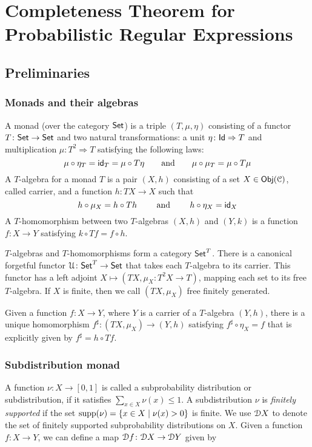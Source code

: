 \chapter{Completeness Theorem for Probabilistic Regular Expressions}
\label{chapter4}

\section{Preliminaries}
\label{c4:sec:preliminaries}
\subsection{Monads and their algebras}\label{c4:subsec:monads}
A monad (over the category ${\mathsf{Set}}$) is a triple $(T, \mu, \eta)$ consisting of a functor $T \colon {\mathsf{Set}} \to {\mathsf{Set}}$ and two natural transformations: a unit $\eta \colon \mathsf{Id} \Rightarrow T$ and multiplication $\mu \colon T^2 \Rightarrow T$ satisfying the following laws:
$$\mu \circ \eta_T = \mathsf{id}_T=  \mu \circ T\eta \qquad \text{and} \qquad \mu \circ \mu_T = \mu \circ T \mu$$
A $T$-algebra for a monad $T$ is a pair $(X, h)$ consisting of a set $X \in \mathsf{Obj}(\mathcal{C})$, called carrier, and a function $h \colon T X \to X$ such that 
$$
h \circ \mu_X = h \circ Th \qquad \text{ and }\qquad h \circ \eta_X = \mathsf{id}_X
$$
A $T$-homomorphism between two $T$-algebras $(X,h)$ and $(Y,k)$ is a function 	$f \colon X \to Y$ satisfying $k \circ Tf = f \circ h$.

$T$-algebras and $T$-homomorphisms form a category ${\mathsf{Set}}^T$. There is a canonical forgetful functor $\mathcal{U} \colon {\mathsf{Set}}^T \to {\mathsf{Set}}$ that takes each $T$-algebra to its carrier. This functor has a left adjoint $X \mapsto (TX, \mu_X \colon T^2 X \to T)$, mapping each set to its free $T$-algebra. If $X$ is finite, then we call $(TX, \mu_X)$ free finitely generated.

Given a function $f \colon X \to Y$, where $Y$ is a carrier of a $T$-algebra $(Y, h)$, there is a unique homomorphism $f^\sharp \colon (TX, \mu_X) \to (Y,h)$ satisfying $f^\sharp \circ \eta_X = f$ that is explicitly given by $f^\sharp = h \circ Tf$.

\subsection{Subdistribution monad}\label{c4:subsec:subdistribution}
 A function $\nu : X \to [0,1]$ is called a subprobability distribution or subdistribution, if it satisfies $\sum_{x \in X} \nu(x) \leq 1$. A subdistribution $\nu$ is \emph{finitely supported}  if the set $\operatorname{supp}(\nu) = \{x \in X \mid \nu(x) > 0\}$ is finite. We use $\mathcal{D} {X}$ to denote the set of finitely supported subprobability distributions on $X$. Given a function $f \colon X \to Y$, we can define a map $\mathcal{D} f \colon \mathcal{D} X \to \mathcal{D} Y$ given by 
 
